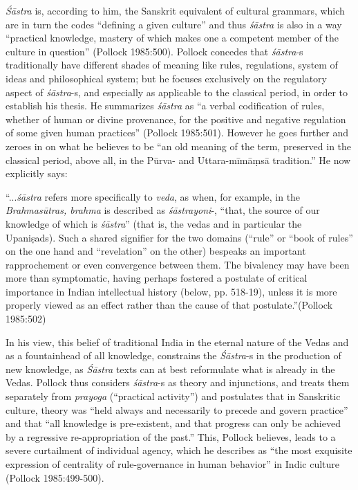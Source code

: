 {\sl Śāstra} is, according to him, the Sanskrit equivalent of cultural grammars, which are in turn the codes ``defining a given culture'' and thus {\sl śāstra} is also in a way ``practical knowledge, mastery of which makes one a competent member of the culture in question'' (Pollock 1985:500). Pollock concedes that {\sl śāstra}-s traditionally have different shades of meaning like rules, regulations, system of ideas and philosophical system; but he focuses exclusively on the regulatory  aspect of {\sl śāstra}-s, and especially as applicable to the classical period, in order to establish his thesis. He summarizes {\sl śāstra} as ``a verbal codification of rules, whether of human or divine provenance, for the positive and negative regulation of some given human practices'' (Pollock 1985:501). However he goes further and zeroes in on what he believes to be ``an old meaning of the term, preserved in the classical period, above all, in the Pūrva- and Uttara-mīmāṃsā tradition.'' He now explicitly says: 
\begin{myquote}
``...{\sl śāstra} refers more specifically to {\sl veda}, as when, for example, in the {\sl Brahmasūtras, brahma} is described as {\sl śāstrayoni}-, ``that, the source of our knowledge of which is {\sl śāstra}'' (that is, the vedas and in particular the Upaniṣads). Such a shared signifier for the two domains (``rule'' or ``book of rules'' on the one hand and ``revelation'' on the other) bespeaks an important rapprochement or even convergence between them. The bivalency may have been more than symptomatic, having perhaps fostered a postulate of critical importance in Indian intellectual history (below, pp. 518-19), unless it is more properly viewed as an effect rather than the cause of that postulate.”\hfill 	(Pollock 1985:502)
\end{myquote}

In his view, this belief of traditional India in the eternal nature of the Vedas and as a fountainhead of all knowledge, constrains the {\sl Śāstra}-s in the production of new knowledge, as {\sl Śāstra} texts can at best reformulate what is already in the Vedas. Pollock thus considers {\sl śāstra}-s as theory and injunctions, and treats them separately from {\sl prayoga} (``practical activity'') and postulates that in Sanskritic culture, theory was ``held always and necessarily to precede and govern practice'' and that ``all knowledge is pre-existent, and that progress can only be achieved by a regressive re-appropriation of the past.'' This, Pollock believes, leads to a severe curtailment of individual agency, which he describes as ``the most exquisite expression of centrality of rule-governance in human behavior'' in Indic culture (Pollock 1985:499-500). 

